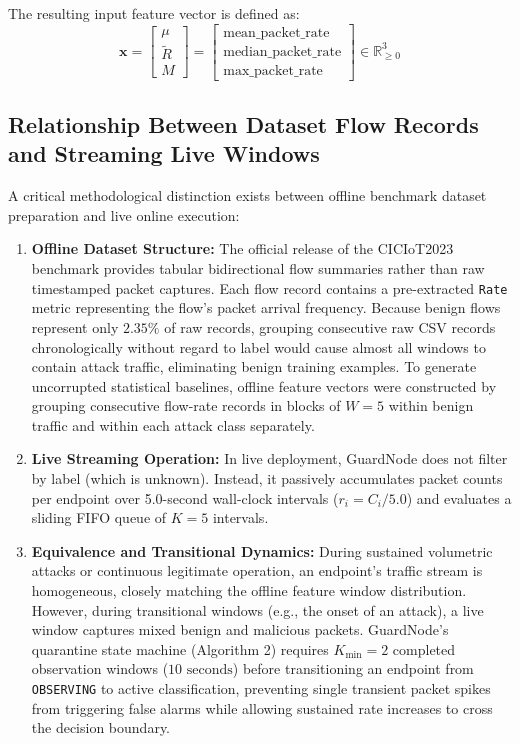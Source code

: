 \documentclass[conference]{IEEEtran}
\begin{document}
The resulting input feature vector is defined as:
\begin{equation}
\mathbf{x} = \begin{bmatrix} \mu \\ \tilde{R} \\ M \end{bmatrix} = \begin{bmatrix} \text{mean\_packet\_rate} \\ \text{median\_packet\_rate} \\ \text{max\_packet\_rate} \end{bmatrix} \in \mathbb{R}^3_{\ge 0}
\end{equation}

\subsection{Relationship Between Dataset Flow Records and Streaming Live Windows}
A critical methodological distinction exists between offline benchmark dataset preparation and live online execution:
\begin{enumerate}
    \item \textbf{Offline Dataset Structure:} The official release of the CICIoT2023 benchmark \cite{ref_ciciot2023} provides tabular bidirectional flow summaries rather than raw timestamped packet captures. Each flow record contains a pre-extracted \texttt{Rate} metric representing the flow's packet arrival frequency. Because benign flows represent only $2.35\%$ of raw records, grouping consecutive raw CSV records chronologically without regard to label would cause almost all windows to contain attack traffic, eliminating benign training examples. To generate uncorrupted statistical baselines, offline feature vectors were constructed by grouping consecutive flow-rate records in blocks of $W=5$ within benign traffic and within each attack class separately.
    \item \textbf{Live Streaming Operation:} In live deployment, GuardNode does not filter by label (which is unknown). Instead, it passively accumulates packet counts per endpoint over 5.0-second wall-clock intervals ($r_i = C_i / 5.0$) and evaluates a sliding FIFO queue of $K=5$ intervals.
    \item \textbf{Equivalence and Transitional Dynamics:} During sustained volumetric attacks or continuous legitimate operation, an endpoint's traffic stream is homogeneous, closely matching the offline feature window distribution. However, during transitional windows (e.g., the onset of an attack), a live window captures mixed benign and malicious packets. GuardNode's quarantine state machine (Algorithm 2) requires $K_{\min} = 2$ completed observation windows ($10\text{ seconds}$) before transitioning an endpoint from \texttt{OBSERVING} to active classification, preventing single transient packet spikes from triggering false alarms while allowing sustained rate increases to cross the decision boundary.
\end{enumerate}
\end{document}
